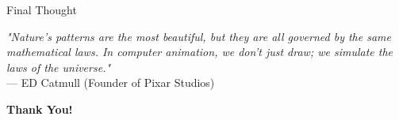 \documentclass{beamer}
\begin{document}
\begin{frame}{Final Thought}

\begin{center}
\large
\textit{"Nature’s patterns are the most beautiful, but they are all governed by the same mathematical laws. In computer animation, we don't just draw; we simulate the laws of the universe."}
\\[0.3cm]
--- ED Catmull (Founder of Pixar Studios)
\end{center}

\vspace{0.5cm}
\begin{center}
\textbf{Thank You!}
\end{center}

\end{frame}

\end{document}
